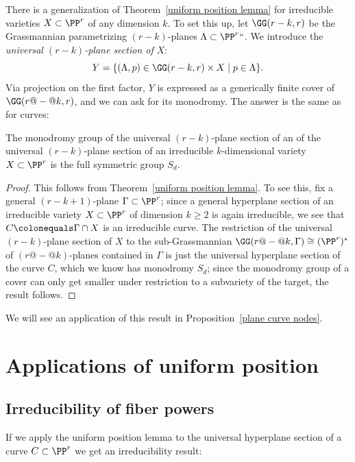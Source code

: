 There is
a generalization of Theorem~\ref{uniform position lemma}
for irreducible varieties $X \subset \PP^r$ of any dimension $k$. To set
this up, let $\GG(r-k,r)$ be the
Grassmannian
%
parametrizing $(r-k)$-planes
$\Lambda \subset \PP^r` `$. We introduce the \emph{universal $(r-k)$-plane
section of} $X$:
$$
Y = \{ (\Lambda, p) \in \GG(r-k,r) \times X \mid p \in \Lambda \}.
$$
Via
projection on the first factor, $Y$
is expressed as a generically finite
cover of $\GG(r{@-@}k,r)$, and we can ask for its monodromy. The answer is
the same as for curves:


\begin{theorem}\label{higher dim uniform position lemma}
The monodromy group of the universal $(r-k)$-plane section of an
%
%
of the universal $(r-k)$-plane section of an
irreducible $k$-dimensional variety $X \subset \PP^r$ is the full
%
symmetric group
$S_d$.
\end{theorem}

\begin{proof}
This follows from Theorem~\ref{uniform position lemma}.
To see this,
fix a general $(r-k+1)$-plane $\Gamma \subset \PP^r$; since a
general hyperplane section of an irreducible variety $X \subset \PP^r$
of dimension $k \geq 2$ is again irreducible, we see that $C \colonequals
\Gamma \cap X$ is an irreducible curve. The restriction of the universal
$(r-k)$-plane section of $X$ to the sub-Grassmannian $\GG(r{@-@}k, \Gamma)
\cong (\PP^r)^*$ of $(r{@-@}k)$-planes contained in $\Gamma$ is just the
universal hyperplane section of the curve $C$, which we know has monodromy
$S_d$; since the monodromy group of a cover can only get smaller under
restriction to a subvariety of the target, the result follows.
\end{proof}

We will see an application of this result in
Proposition~\ref{plane curve nodes}.

\section{Applications of uniform position}
\subsection*{Irreducibility of fiber powers}

If we apply the uniform position lemma to the universal hyperplane
section of a curve $C \subset \PP^r$ we get an irreducibility result:

